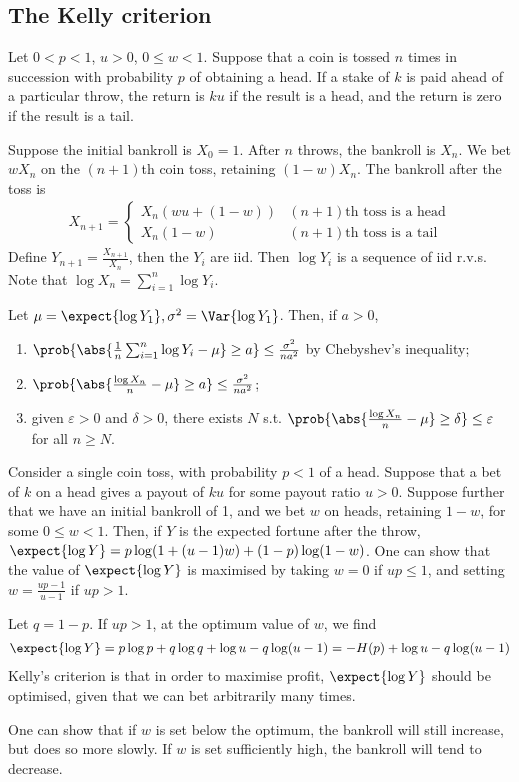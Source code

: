 \subsection{The Kelly criterion}
Let $0 < p < 1$, $u > 0$, $0 \leq w < 1$.
Suppose that a coin is tossed $n$ times in succession with probability $p$ of obtaining a head.
If a stake of $k$ is paid ahead of a particular throw, the return is $ku$ if the result is a head, and the return is zero if the result is a tail.

Suppose the initial bankroll is $X_0 = 1$.
After $n$ throws, the bankroll is $X_n$.
We bet $w X_n$ on the $(n + 1)$th coin toss, retaining $(1-w)X_n$.
The bankroll after the toss is
\begin{align*}
        X_{n+1} = \begin{cases}
    X_n(wu + (1-w)) & (n + 1)\text{th toss is a head} \\
    X_n(1-w) & (n + 1)\text{th toss is a tail}
\end{cases}
    \end{align*}
Define $Y_{n+1} = \frac{X_{n+1}}{X_n}$, then the $Y_i$ are iid.
Then $\log Y_i$ is a sequence of iid r.v.s.
Note that $\log X_n = \sum_{i=1}^n \log Y_i$.
\begin{lemma}
    Let $\mu = \expect{\log Y_1}, \sigma^2 = \Var{\log Y_1}$.
    Then, if $a > 0$,
    \begin{enumerate}
        \item $\prob{\abs{\frac{1}{n} \sum_{i=1}^n \log Y_i - \mu} \geq a} \leq \frac{\sigma^2}{na^2}$ by Chebyshev's inequality;
        \item $\prob{\abs{\frac{\log X_n}{n} - \mu} \geq a} \leq \frac{\sigma^2}{na^2}$;
        \item given $\varepsilon > 0$ and $\delta > 0$, there exists $N$ s.t. $\prob{\abs{\frac{\log X_n}{n} - \mu} \geq \delta} \leq \varepsilon$ for all $n \geq N$.
    \end{enumerate}
\end{lemma}
Consider a single coin toss, with probability $p < 1$ of a head.
Suppose that a bet of $k$ on a head gives a payout of $ku$ for some payout ratio $u > 0$.
Suppose further that we have an initial bankroll of 1, and we bet $w$ on heads, retaining $1 - w$, for some $0 \leq w < 1$.
Then, if $Y$ is the expected fortune after the throw, $\expect{\log Y} = p \log(1 + (u-1)w) + (1-p) \log(1-w)$.
One can show that the value of $\expect{\log Y}$ is maximised by taking $w = 0$ if $up \leq 1$, and setting $w = \frac{up-1}{u-1}$ if $up > 1$.

Let $q = 1-p$.
If $up > 1$, at the optimum value of $w$, we find
\begin{align*}
        \expect{\log Y} = p \log p + q \log q + \log u - q \log(u-1) = -H(p) + \log u - q \log(u-1)
    \end{align*}
Kelly's criterion is that in order to maximise profit, $\expect{\log Y}$ should be optimised, given that we can bet arbitrarily many times.

One can show that if $w$ is set below the optimum, the bankroll will still increase, but does so more slowly.
If $w$ is set sufficiently high, the bankroll will tend to decrease.
